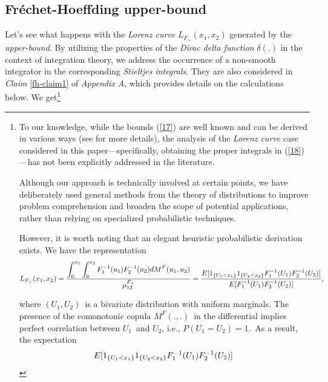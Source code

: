 \documentclass[onecolumn]{article}
\providecommand{\dint}{\displaystyle\int}
\renewcommand{\dint}{\displaystyle\int}
\begin{document}
\subsection{Fr\'{e}chet-Hoeffding upper-bound}

Let's see what happens with the \textit{Lorenz curve} $%
L_{F_{+}}(x_{1},x_{2}) $ generated by the \textit{upper-bound}. By utilizing
the properties of the \textit{Dirac delta function} $\delta (.)$ in the
context of integration theory, we address the occurrence of a non-smooth
integrator in the corresponding \textit{Stieltjes integrals}. They are also
considered in \textit{Claim }\ref{fh-claim1} of \textit{Appendix A}, which
provides details on the calculations below. We get\footnote{{\footnotesize %
To our knowledge, while the bounds (\ref{17}) are well known and can be
derived in various ways (see \cite[Remark~3.25]{[5]} for more details), the
analysis of the \textit{Lorenz curve} case considered in this
paper---specifically, obtaining the proper integrals in (\ref{18})---has not
been explicitly addressed in the literature.}
\par
{\footnotesize Although our approach is technically involved at certain
points, we have deliberately used general methods from the theory of
distributions to improve problem comprehension and broaden the scope of
potential applications, rather than relying on specialized probabilistic
techniques.}
\par
{\footnotesize However, it is worth noting that an elegant heuristic
probabilistic derivation exists. We have the representation }%
\begin{equation*}
L_{F_{+}}(x_{1},x_{2})=\frac{\dint\nolimits_{0}^{x_{1}}\dint%
\nolimits_{0}^{x_{2}}F_{1}^{-1}(u_{1})F_{2}^{-1}(u_{2})dM^{F}(u_{1},u_{2})}{%
\mu _{12}^{F_{+}}}=\frac{E[1_{\{U_{1}<x_{1}\}}1_{\{U_{2}<x_{2}%
\}}F_{1}^{-1}(U_{1})F_{2}^{-1}(U_{2})]}{E[F_{1}^{-1}(U_{1})F_{2}^{-1}(U_{2})]%
},
\end{equation*}%
\par
{\footnotesize where }$(U_{1},U_{2})${\footnotesize \ is a bivariate
distribution with uniform marginals. The presence of the comonotonic copula }%
$M^{F}(.,.)${\footnotesize \ in the differential implies perfect correlation
between }$U_{1}${\footnotesize \ and }$U_{2}${\footnotesize , i.e., }$%
P(U_{1}=U_{2})=1.${\footnotesize \ As a result, the expectation }%
\begin{equation*}
E[1_{\{U_{1}<x_{1}\}}1_{\{U_{2}<x_{2}\}}F_{1}^{-1}(U_{1})F_{2}^{-1}(U_{2})]%
{\footnotesize \ }
\end{equation*}%
}
\end{document}
